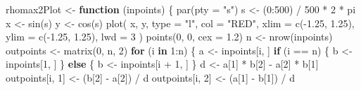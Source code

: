 \documentclass[
  12pt,
]{book}
\newenvironment{Shaded}{\begin{snugshade}}{\end{snugshade}}
\newcommand{\AttributeTok}[1]{\textcolor[rgb]{0.77,0.63,0.00}{#1}}
\newcommand{\ControlFlowTok}[1]{\textcolor[rgb]{0.13,0.29,0.53}{\textbf{#1}}}
\newcommand{\DecValTok}[1]{\textcolor[rgb]{0.00,0.00,0.81}{#1}}
\newcommand{\FloatTok}[1]{\textcolor[rgb]{0.00,0.00,0.81}{#1}}
\newcommand{\FunctionTok}[1]{\textcolor[rgb]{0.00,0.00,0.00}{#1}}
\newcommand{\NormalTok}[1]{#1}
\newcommand{\OtherTok}[1]{\textcolor[rgb]{0.56,0.35,0.01}{#1}}
\newcommand{\SpecialCharTok}[1]{\textcolor[rgb]{0.00,0.00,0.00}{#1}}
\newcommand{\StringTok}[1]{\textcolor[rgb]{0.31,0.60,0.02}{#1}}
\theoremstyle{definition}
\theoremstyle{definition}
\theoremstyle{definition}
\theoremstyle{definition}
\theoremstyle{remark}
\begin{document}
\begin{Shaded}
\begin{Highlighting}[]
\NormalTok{rhomax2Plot }\OtherTok{\textless{}{-}} \ControlFlowTok{function}\NormalTok{ (inpoints) \{}
  \FunctionTok{par}\NormalTok{(}\AttributeTok{pty =} \StringTok{"s"}\NormalTok{)}
\NormalTok{  s }\OtherTok{\textless{}{-}}\NormalTok{ (}\DecValTok{0}\SpecialCharTok{:}\DecValTok{500}\NormalTok{) }\SpecialCharTok{/} \DecValTok{500} \SpecialCharTok{*} \DecValTok{2} \SpecialCharTok{*}\NormalTok{ pi}
\NormalTok{  x }\OtherTok{\textless{}{-}} \FunctionTok{sin}\NormalTok{(s)}
\NormalTok{  y }\OtherTok{\textless{}{-}} \FunctionTok{cos}\NormalTok{(s)}
  \FunctionTok{plot}\NormalTok{(}
\NormalTok{    x,}
\NormalTok{    y,}
    \AttributeTok{type =} \StringTok{"l"}\NormalTok{,}
    \AttributeTok{col =} \StringTok{"RED"}\NormalTok{,}
    \AttributeTok{xlim =} \FunctionTok{c}\NormalTok{(}\SpecialCharTok{{-}}\FloatTok{1.25}\NormalTok{, }\FloatTok{1.25}\NormalTok{),}
    \AttributeTok{ylim =} \FunctionTok{c}\NormalTok{(}\SpecialCharTok{{-}}\FloatTok{1.25}\NormalTok{, }\FloatTok{1.25}\NormalTok{),}
    \AttributeTok{lwd =} \DecValTok{3}
\NormalTok{  )}
  \FunctionTok{points}\NormalTok{(}\DecValTok{0}\NormalTok{, }\DecValTok{0}\NormalTok{, }\AttributeTok{cex =} \FloatTok{1.2}\NormalTok{)}
\NormalTok{  n }\OtherTok{\textless{}{-}} \FunctionTok{nrow}\NormalTok{(inpoints)}
\NormalTok{  outpoints }\OtherTok{\textless{}{-}} \FunctionTok{matrix}\NormalTok{(}\DecValTok{0}\NormalTok{, n, }\DecValTok{2}\NormalTok{)}
  \ControlFlowTok{for}\NormalTok{ (i }\ControlFlowTok{in} \DecValTok{1}\SpecialCharTok{:}\NormalTok{n) \{}
\NormalTok{    a }\OtherTok{\textless{}{-}}\NormalTok{ inpoints[i, ]}
    \ControlFlowTok{if}\NormalTok{ (i }\SpecialCharTok{==}\NormalTok{ n) \{}
\NormalTok{      b }\OtherTok{\textless{}{-}}\NormalTok{ inpoints[}\DecValTok{1}\NormalTok{, ]}
\NormalTok{    \} }\ControlFlowTok{else}\NormalTok{ \{}
\NormalTok{      b }\OtherTok{\textless{}{-}}\NormalTok{ inpoints[i }\SpecialCharTok{+} \DecValTok{1}\NormalTok{, ]}
\NormalTok{    \}}
\NormalTok{    d }\OtherTok{\textless{}{-}}\NormalTok{ a[}\DecValTok{1}\NormalTok{] }\SpecialCharTok{*}\NormalTok{ b[}\DecValTok{2}\NormalTok{] }\SpecialCharTok{{-}}\NormalTok{ a[}\DecValTok{2}\NormalTok{] }\SpecialCharTok{*}\NormalTok{ b[}\DecValTok{1}\NormalTok{]}
\NormalTok{    outpoints[i, }\DecValTok{1}\NormalTok{] }\OtherTok{\textless{}{-}}\NormalTok{ (b[}\DecValTok{2}\NormalTok{] }\SpecialCharTok{{-}}\NormalTok{ a[}\DecValTok{2}\NormalTok{]) }\SpecialCharTok{/}\NormalTok{ d}
\NormalTok{    outpoints[i, }\DecValTok{2}\NormalTok{] }\OtherTok{\textless{}{-}}\NormalTok{ (a[}\DecValTok{1}\NormalTok{] }\SpecialCharTok{{-}}\NormalTok{ b[}\DecValTok{1}\NormalTok{]) }\SpecialCharTok{/}\NormalTok{ d}

\end{Highlighting}
\end{Shaded}
\end{document}
